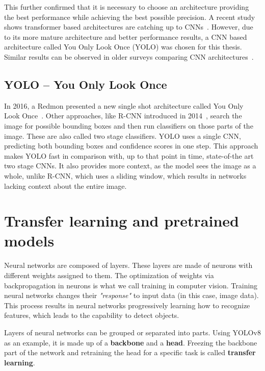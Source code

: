 This further confirmed that it is necessary to choose an architecture providing the best performance while achieving the best possible precision. A recent study shows transformer based architectures are catching up to CNNs~\cite{wang2026evolution}. However, due to its more mature architecture and better performance results, a CNN based architecture called You Only Look Once (YOLO) was chosen for this thesis. Similar results can be observed in older surveys comparing CNN architectures~\cite{objectDetectionSurvey2024, objectDetectionSurvey2025}.

\subsection{YOLO -- You Only Look Once}
\label{yolo}
In 2016, a Redmon presented a new single shot architecture called You Only Look Once~\cite{Redmon_2016_CVPR}. Other approaches, like R-CNN introduced in 2014~\cite{girshick2014rich}, search the image for possible bounding boxes and then run classifiers on those parts of the image. These are also called two stage classifiers. YOLO uses a single CNN, predicting both bounding boxes and confidence scores in one step. This approach makes YOLO fast in comparison with, up to that point in time, state-of-the art two stage CNNs. It also provides more context, as the model sees the image as a whole, unlike R-CNN, which uses a sliding window, which results in networks lacking context about the entire image.



\section{Transfer learning and pretrained models}
\label{pretrainedModels}
\label{transferLearning}
Neural networks are composed of layers. These layers are made of neurons with different weights assigned to them. The optimization of weights via backpropagation in neurons is what we call training in computer vision. Training neural networks changes their \textit{"response"} to input data (in this case, image data). This process results in neural networks progressively learning how to recognize features, which leads to the capability to detect objects.

Layers of neural networks can be grouped or separated into parts. Using YOLOv8 as an example, it is made up of a \textbf{backbone} and a \textbf{head}. Freezing the backbone part of the network and retraining the head for a specific task is called \textbf{transfer learning}. 

